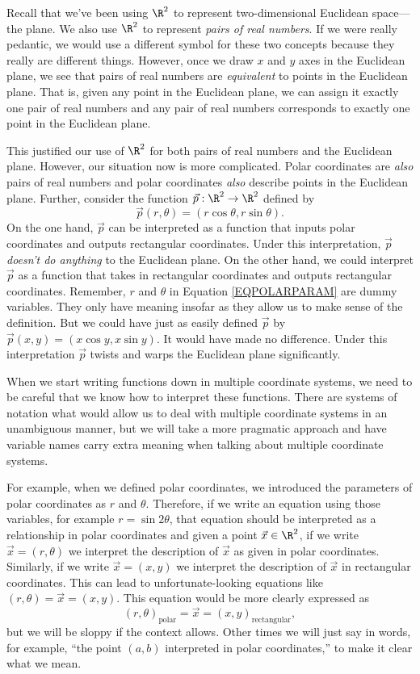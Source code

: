Recall that we've been using $\R^2$ to represent two-dimensional Euclidean space---the plane.
We also use $\R^2$ to represent \emph{pairs of real numbers}.  If we were really pedantic,
we would use a different symbol for these two concepts because they really are different things.
However, once we draw $x$ and $y$ axes in the Euclidean plane, we see that pairs of real numbers
are \emph{equivalent} to points in the Euclidean plane.  That is, given any point in the Euclidean
plane, we can assign it exactly one pair of real numbers and any pair of real numbers corresponds
to exactly one point in the Euclidean plane.


This justified our use of $\R^2$ for both pairs of real numbers and the Euclidean plane.  However, our
situation now is more complicated.  Polar coordinates are \emph{also} pairs of real numbers
and polar coordinates \emph{also} describe points in the Euclidean plane.  Further, consider the function
$\vec p:\R^2\to\R^2$ defined by
\begin{equation}
	\label{EQPOLARPARAM}
	\vec p(r,\theta) = (r\cos\theta,r\sin\theta).
\end{equation}
On the one hand, $\vec p$ can be interpreted as a function that inputs polar coordinates and outputs
rectangular coordinates.  Under this interpretation, $\vec p$ \emph{doesn't do anything} to
the Euclidean plane.  On the other hand, we could interpret $\vec p$ as a function that takes in
rectangular coordinates and outputs rectangular coordinates.  Remember, $r$ and $\theta$ in Equation
\eqref{EQPOLARPARAM} are dummy variables.  They only have meaning insofar as they allow us to make
sense of the definition.  But we could have just as easily defined $\vec p$ by $\vec p(x,y) = (x\cos y,x\sin y)$.
It would have made no difference.  Under this interpretation $\vec p$ twists and warps the Euclidean
plane significantly.

When we start writing functions down in multiple coordinate systems, we need to be careful
that we know how to interpret these functions.  There are systems of notation what would allow
us to deal with multiple coordinate systems in an unambiguous manner, but we will take a more
pragmatic approach and have variable names carry extra meaning when talking about multiple coordinate systems.

For example, when we defined polar coordinates, we introduced the parameters of polar coordinates
as $r$ and $\theta$.  Therefore, if we write an equation using those variables,
for example $r=\sin2\theta$, that equation should be interpreted as a relationship in polar coordinates
and given a point $\vec x\in\R^2$, if we write $\vec x=(r,\theta)$ we interpret the description of $\vec x$
as given in polar coordinates.  Similarly, if we write $\vec x=(x,y)$ we interpret the description of $\vec x$
in rectangular coordinates.  This can lead to unfortunate-looking equations like $(r,\theta)=\vec x=(x,y)$.
This equation would be more clearly expressed as
\[
	(r,\theta)_{\text{polar}} = \vec x=(x,y)_{\text{rectangular}},
\]
but we will be sloppy if the context allows.  Other times we will just say in words, for example, ``the
point $(a,b)$ interpreted in polar coordinates,'' to make it clear what we mean.


